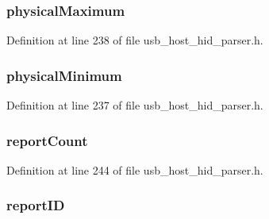 \subsubsection[{physical\+Maximum}]{ physical\+Maximum}\label{struct___h_i_d___g_l_o_b_a_l_s_a9900a11df4d44927b37e192974af3dae}


Definition at line 238 of file usb\+\_\+host\+\_\+hid\+\_\+parser.\+h.

\hypertarget{struct___h_i_d___g_l_o_b_a_l_s_a699961d0956e0505697a0fd456d2c5ff}{}
\subsubsection[{physical\+Minimum}]{ physical\+Minimum}\label{struct___h_i_d___g_l_o_b_a_l_s_a699961d0956e0505697a0fd456d2c5ff}


Definition at line 237 of file usb\+\_\+host\+\_\+hid\+\_\+parser.\+h.

\hypertarget{struct___h_i_d___g_l_o_b_a_l_s_a48899e70da0d5fe2099bd6dfd8e1e42b}{}
\subsubsection[{report\+Count}]{ report\+Count}\label{struct___h_i_d___g_l_o_b_a_l_s_a48899e70da0d5fe2099bd6dfd8e1e42b}


Definition at line 244 of file usb\+\_\+host\+\_\+hid\+\_\+parser.\+h.

\hypertarget{struct___h_i_d___g_l_o_b_a_l_s_a22c28a72fd9262be3873e68ec1504ac8}{}
\subsubsection[{report\+I\+D}]{ report\+I\+D}\label{struct___h_i_d___g_l_o_b_a_l_s_a22c28a72fd9262be3873e68ec1504ac8}


